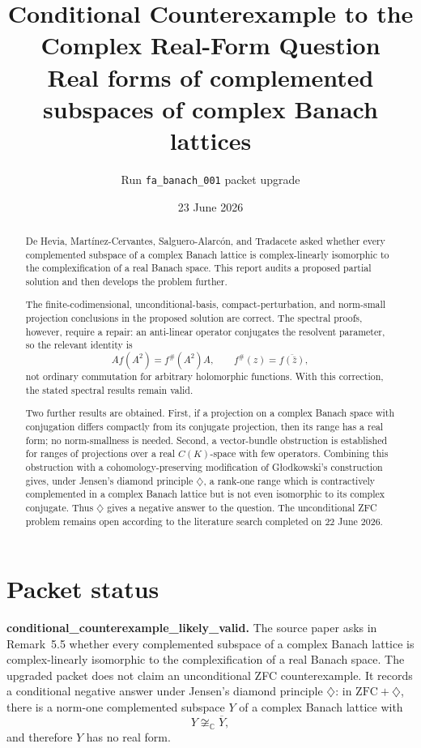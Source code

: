 \documentclass[11pt]{article}
\title{\textbf{Conditional Counterexample to the Complex Real-Form Question}\\
\large Real forms of complemented subspaces of complex Banach lattices}
\author{Run \texttt{fa\_banach\_001} packet upgrade}
\date{23 June 2026}
\theoremstyle{definition}
\theoremstyle{remark}
\newcommand{\C}{\mathbb C}
\begin{document}
\maketitle

\begin{abstract}
De Hevia, Mart\'inez-Cervantes, Salguero-Alarc\'on, and Tradacete asked whether every complemented subspace of a complex Banach lattice is complex-linearly isomorphic to the complexification of a real Banach space. This report audits a proposed partial solution and then develops the problem further.

The finite-codimensional, unconditional-basis, compact-perturbation, and norm-small projection conclusions in the proposed solution are correct. The spectral proofs, however, require a repair: an anti-linear operator conjugates the resolvent parameter, so the relevant identity is
\[
 A f(A^2)=f^{\#}(A^2)A,\qquad f^{\#}(z)=\overline{f(\bar z)},
\]
not ordinary commutation for arbitrary holomorphic functions. With this correction, the stated spectral results remain valid.

Two further results are obtained. First, if a projection on a complex Banach space with conjugation differs compactly from its conjugate projection, then its range has a real form; no norm-smallness is needed. Second, a vector-bundle obstruction is established for ranges of projections over a real $C(K)$-space with few operators. Combining this obstruction with a cohomology-preserving modification of G\l odkowski's construction gives, under Jensen's diamond principle $\diamondsuit$, a rank-one range which is contractively complemented in a complex Banach lattice but is not even isomorphic to its complex conjugate. Thus $\diamondsuit$ gives a negative answer to the question. The unconditional ZFC problem remains open according to the literature search completed on 22 June 2026.
\end{abstract}

\section*{Packet status}

\textbf{conditional\_counterexample\_likely\_valid.}  The source paper asks in
Remark~5.5 whether every complemented subspace of a complex Banach lattice is
complex-linearly isomorphic to the complexification of a real Banach space.
The upgraded packet does not claim an unconditional ZFC counterexample.  It
records a conditional negative answer under Jensen's diamond principle
\(\diamondsuit\): in \(\mathrm{ZFC}+\diamondsuit\), there is a norm-one
complemented subspace \(Y\) of a complex Banach lattice with
\[
       Y\not\cong_{\C}\overline Y,
\]
and therefore \(Y\) has no real form.
\end{document}
